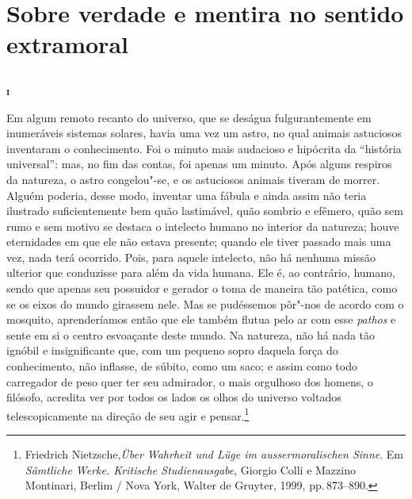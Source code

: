 \part[Sobre verdade e mentira]{Sobre verdade e mentira no sentido extramoral} %

\chapter*{}

\textsc{\textbf{i}}
\bigskip

Em algum remoto recanto do universo, que se deságua fulgurantemente em
inumeráveis sistemas solares, havia uma vez um astro, no qual animais
astuciosos inventaram o conhecimento. Foi o minuto mais audacioso e
hipócrita da “história universal”: mas, no fim das contas, foi apenas
um minuto. Após alguns respiros da natureza, o astro congelou"-se, e
os astuciosos animais tiveram de morrer. Alguém poderia, desse modo,
inventar uma fábula e ainda assim não teria ilustrado suficientemente
bem quão lastimável, quão sombrio e efêmero, quão sem rumo e sem motivo
se destaca o intelecto humano no interior da natureza; houve
eternidades em que ele não estava presente; quando ele tiver passado
mais uma vez, nada terá ocorrido. Pois, para aquele intelecto, não há
nenhuma missão ulterior que conduzisse para além da vida humana. Ele é,
ao contrário, humano, sendo que apenas seu possuidor e gerador o toma
de maneira tão patética, como se os eixos do mundo girassem nele. 
Mas se pudéssemos pôr"-nos de acordo com o mosquito, aprenderíamos então
que ele também flutua pelo ar com esse \textit{pathos} e sente em si o
centro esvoaçante deste mundo. Na natureza, não há nada tão ignóbil e
insignificante que, com um pequeno sopro daquela força do conhecimento,
não inflasse, de súbito, como um saco; e assim como todo carregador de
peso quer ter seu admirador, o mais orgulhoso dos homens, o filósofo,
acredita ver por todos os lados os olhos do universo voltados
telescopicamente na direção de seu agir e pensar.\footnote{Friedrich 
Nietzsche,\textit{Über Wahrheit und Lüge im aussermoralischen Sinne}.
Em \textit{Sämtliche Werke. Kritische Studienausgabe},
Giorgio Colli e Mazzino Montinari, Berlim / Nova York, 
Walter de Gruyter, 1999, pp.\,873--890.}

